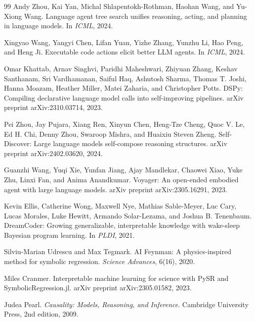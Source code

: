 \documentclass[letterpaper]{article}
\begin{document}
\begin{thebibliography}{99}
Andy Zhou, Kai Yan, Michal Shlapentokh-Rothman, Haohan Wang, and
Yu-Xiong Wang.
\newblock Language agent tree search unifies reasoning, acting, and planning in
language models.
\newblock In \emph{ICML}, 2024.

Xingyao Wang, Yangyi Chen, Lifan Yuan, Yizhe Zhang, Yunzhu Li, Hao Peng,
and Heng Ji.
\newblock Executable code actions elicit better LLM agents.
\newblock In \emph{ICML}, 2024.

Omar Khattab, Arnav Singhvi, Paridhi Maheshwari, Zhiyuan Zhang, Keshav
Santhanam, Sri Vardhamanan, Saiful Haq, Ashutosh Sharma, Thomas T.
Joshi, Hanna Moazam, Heather Miller, Matei Zaharia, and Christopher Potts.
\newblock DSPy: Compiling declarative language model calls into
self-improving pipelines.
\newblock arXiv preprint arXiv:2310.03714, 2023.

Pei Zhou, Jay Pujara, Xiang Ren, Xinyun Chen, Heng-Tze Cheng, Quoc V.
Le, Ed H. Chi, Denny Zhou, Swaroop Mishra, and Huaixiu Steven Zheng.
\newblock Self-Discover: Large language models self-compose reasoning
structures.
\newblock arXiv preprint arXiv:2402.03620, 2024.

Guanzhi Wang, Yuqi Xie, Yunfan Jiang, Ajay Mandlekar, Chaowei Xiao,
Yuke Zhu, Linxi Fan, and Anima Anandkumar.
\newblock Voyager: An open-ended embodied agent with large language models.
\newblock arXiv preprint arXiv:2305.16291, 2023.

Kevin Ellis, Catherine Wong, Maxwell Nye, Mathias Sable-Meyer, Luc Cary,
Lucas Morales, Luke Hewitt, Armando Solar-Lezama, and Joshua B. Tenenbaum.
\newblock DreamCoder: Growing generalizable, interpretable knowledge with
wake-sleep Bayesian program learning.
\newblock In \emph{PLDI}, 2021.

Silviu-Marian Udrescu and Max Tegmark.
\newblock AI Feynman: A physics-inspired method for symbolic regression.
\newblock \emph{Science Advances}, 6(16), 2020.

Miles Cranmer.
\newblock Interpretable machine learning for science with PySR and
SymbolicRegression.jl.
\newblock arXiv preprint arXiv:2305.01582, 2023.

Judea Pearl.
\newblock \emph{Causality: Models, Reasoning, and Inference}.
\newblock Cambridge University Press, 2nd edition, 2009.


\end{thebibliography}
\end{document}
